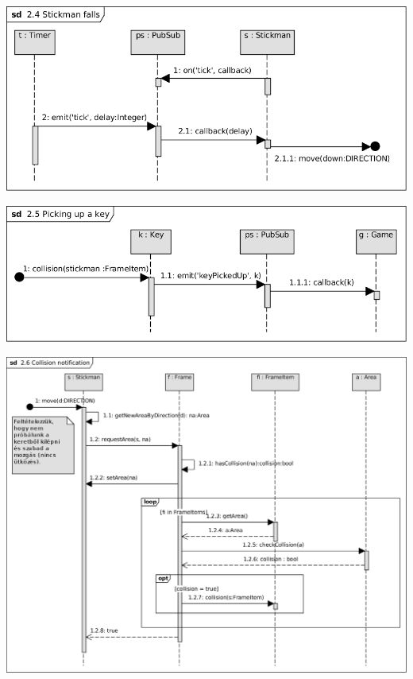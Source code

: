 \begin{center}\includegraphics[scale=1]{resources/24Stickmanfalls.png}\end{center}
\begin{center}\includegraphics[scale=1]{resources/25Pickingupakey.png}\end{center}
\begin{center}\includegraphics[scale=0.8, angle=-90]{resources/26Collisionnotification.png}\end{center}

